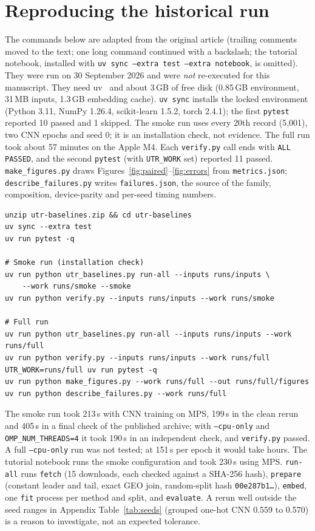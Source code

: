 \documentclass[11pt]{article}
\newcommand{\m}[1]{\texttt{#1}}
\begin{document}
\section{Reproducing the historical run}\label{app:repro}
The commands below are adapted from the original article (trailing comments moved to the text; one long command continued with a
backslash; the tutorial notebook, installed with \m{uv sync --extra test --extra notebook}, is omitted). They were run on 30 September 2026 and were \emph{not} re-executed for
this manuscript. They need uv~\citep{uv} and about 3\,GB of free disk (0.85\,GB environment, 31\,MB inputs, 1.3\,GB
embedding cache). \m{uv sync} installs the locked environment (Python 3.11, NumPy 1.26.4, scikit-learn 1.5.2, torch
2.4.1); the first \m{pytest} reported 10 passed and 1 skipped. The smoke run uses every 20th record (5,001), two CNN
epochs and seed 0; it is an installation check, not evidence. The full run took about 57 minutes on the Apple M4. Each
\m{verify.py} call ends with \m{ALL PASSED}, and the second \m{pytest} (with \m{UTR\_WORK} set) reported 11 passed.
\m{make\_figures.py} draws Figures~\ref{fig:paired}--\ref{fig:errors} from \m{metrics.json}; \m{describe\_failures.py} writes
\m{failures.json}, the source of the family, composition, device-parity and per-seed timing numbers.
\begin{lstlisting}
unzip utr-baselines.zip && cd utr-baselines
uv sync --extra test
uv run pytest -q

# Smoke run (installation check)
uv run python utr_baselines.py run-all --inputs runs/inputs \
    --work runs/smoke --smoke
uv run python verify.py --inputs runs/inputs --work runs/smoke

# Full run
uv run python utr_baselines.py run-all --inputs runs/inputs --work runs/full
uv run python verify.py --inputs runs/inputs --work runs/full
UTR_WORK=runs/full uv run pytest -q
uv run python make_figures.py --work runs/full --out runs/full/figures
uv run python describe_failures.py --work runs/full
\end{lstlisting}
The smoke run took 213\,s with CNN training on MPS, 199\,s in the clean rerun and 405\,s in a final check of the
published archive; with \m{--cpu-only} and \m{OMP\_NUM\_THREADS=4} it took 190\,s in an independent check, and
\m{verify.py} passed. A full \m{--cpu-only} run was not tested; at 151\,s per epoch it would take hours. The tutorial
notebook runs the smoke configuration and took 230\,s using MPS. \m{run-all} runs \m{fetch} (15 downloads, each checked
against a SHA-256 hash), \m{prepare} (constant leader and tail, exact GEO join, random-split hash \m{00e287b1\ldots}),
\m{embed}, one \m{fit} process per method and split, and \m{evaluate}. A rerun well outside the seed ranges in Appendix
Table~\ref{tab:seeds} (grouped one-hot CNN 0.559 to 0.570) is a reason to investigate, not an expected tolerance.
\end{document}
